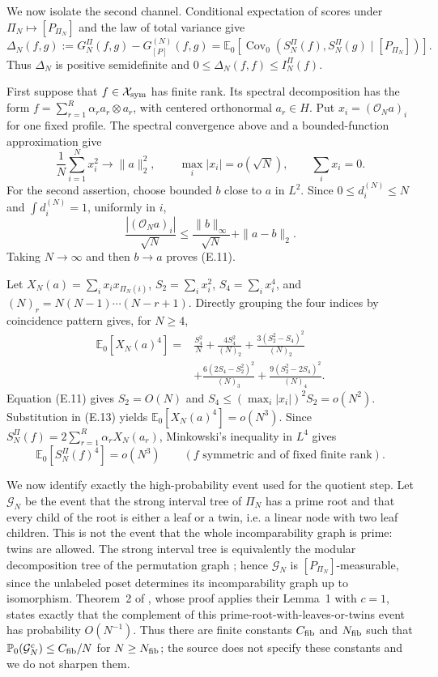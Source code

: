 \documentclass[11pt]{article}
\begin{document}
We now isolate the second channel. Conditional expectation of scores under \(\Pi_N\mapsto[P_{\Pi_N}]\) and the law of total variance give \[ \Delta_N(f,g):=G_N^\Pi(f,g)-G_{[P]}^{(N)}(f,g) =\mathbb E_0\!\left[ \operatorname{Cov}_0(S_N^\Pi(f),S_N^\Pi(g)\mid[P_{\Pi_N}]) \right]. \tag{E.10} \] Thus \(\Delta_N\) is positive semidefinite and \(0\le\Delta_N(f,f)\le I_N^\Pi(f)\).

First suppose that \(f\in\mathcal X_{\rm sym}\) has finite rank. Its spectral decomposition has the form \(f=\sum_{r=1}^R\alpha_r a_r\otimes a_r\), with centered orthonormal \(a_r\in H\). Put \(x_i=(\mathcal O_Na)_i\) for one fixed profile. The spectral convergence above and a bounded-function approximation give \[ \frac1N\sum_{i=1}^Nx_i^2\longrightarrow\|a\|_2^2, \qquad \max_i|x_i|=o(\sqrt N), \qquad \sum_i x_i=0. \tag{E.11} \] For the second assertion, choose bounded \(b\) close to \(a\) in \(L^2\). Since \(0\le d_i^{(N)}\le N\) and \(\int d_i^{(N)}=1\), uniformly in \(i\), \[ \frac{|(\mathcal O_Na)_i|}{\sqrt N} \le\frac{\|b\|_\infty}{\sqrt N}+\|a-b\|_2. \tag{E.12} \] Taking \(N\to\infty\) and then \(b\to a\) proves (E.11).

Let \(X_N(a)=\sum_i x_i x_{\Pi_N(i)}\), \(S_2=\sum_i x_i^2\), \(S_4=\sum_i x_i^4\), and \((N)_r=N(N-1)\cdots(N-r+1)\). Directly grouping the four indices by coincidence pattern gives, for \(N\ge4\), \[ \begin{aligned} \mathbb E_0[X_N(a)^4] ={}&\frac{S_4^2}{N} +\frac{4S_4^2}{(N)_2} +\frac{3(S_2^2-S_4)^2}{(N)_2}\\ &+\frac{6(2S_4-S_2^2)^2}{(N)_3} +\frac{9(S_2^2-2S_4)^2}{(N)_4}. \end{aligned} \tag{E.13} \] Equation (E.11) gives \(S_2=O(N)\) and \(S_4\le(\max_i|x_i|)^2S_2=o(N^2)\). Substitution in (E.13) yields \(\mathbb E_0[X_N(a)^4]=o(N^3)\). Since \(S_N^\Pi(f)=2\sum_{r=1}^R\alpha_rX_N(a_r)\), Minkowski's inequality in \(L^4\) gives \[ \mathbb E_0[S_N^\Pi(f)^4]=o(N^3) \qquad(f\text{ symmetric and of fixed finite rank}). \tag{E.14} \]

We now identify exactly the high-probability event used for the quotient step. Let \(\mathcal G_N\) be the event that the strong interval tree of \(\Pi_N\) has a prime root and that every child of the root is either a leaf or a twin, i.e. a linear node with two leaf children. This is not the event that the whole incomparability graph is prime: twins are allowed. The strong interval tree is equivalently the modular decomposition tree of the permutation graph \citep[Remark~1]{BouvelChauveMishnaRossin2009}; hence \(\mathcal G_N\) is \([P_{\Pi_N}]\)-measurable, since the unlabeled poset determines its incomparability graph up to isomorphism. Theorem~2 of \citet{BouvelChauveMishnaRossin2009}, whose proof applies their Lemma~1 with \(c=1\), states exactly that the complement of this prime-root-with-leaves-or-twins event has probability \(O(N^{-1})\). Thus there are finite constants \(C_{\rm fib}\) and \(N_{\rm fib}\) such that \(\mathbb P_0(\mathcal G_N^c)\le C_{\rm fib}/N\) for \(N\ge N_{\rm fib}\); the source does not specify these constants and we do not sharpen them.
\end{document}
